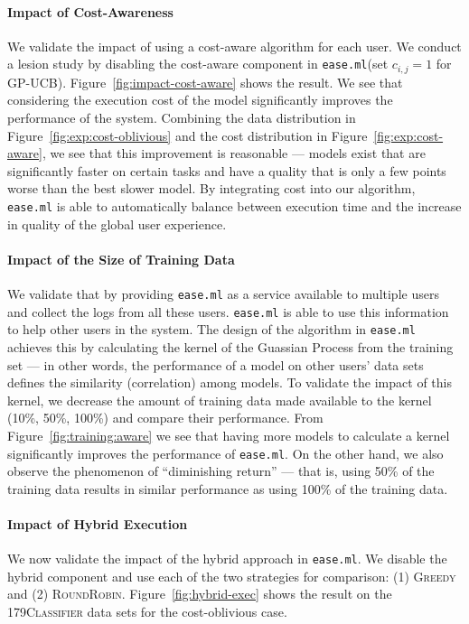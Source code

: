 \documentclass[letterpaper]{vldb}
\newcommand{\eml}{\texttt{ease.ml}\xspace}
\begin{document}
\vspace{-1em}
\paragraph*{Impact of Cost-Awareness}
We validate the impact of using 
a cost-aware algorithm
for each user. We conduct a lesion
study by disabling the cost-aware
component in \eml (set $c_{i,j}=1$
for GP-UCB). Figure~\ref{fig:impact-cost-aware}
shows the result.
We see that considering the
execution cost of the model significantly
improves the performance of the system.
Combining the data distribution in
Figure~\ref{fig:exp:cost-oblivious}
and the cost distribution in 
Figure~\ref{fig:exp:cost-aware},
we see that this improvement
is reasonable --- models exist
that are significantly faster
on certain tasks and have a quality that
is only a few points worse than the
best slower model. By integrating
cost into our algorithm, \eml is
able to automatically balance between
execution time and the increase in quality of the global
user experience.

\vspace{-1em}
\paragraph*{Impact of the Size of Training Data}

We validate that by providing \eml as
a service available to multiple users
and collect the logs from all these users.
\eml is able to use this information to
help other users in the system. The
design of the algorithm in \eml achieves
this by calculating the kernel of the Guassian Process from the training set --- in other words,
the performance of a model on other users'
data sets defines the similarity (correlation)
among models. To validate the impact
of this kernel, we decrease the amount
of training data made available to
the kernel (10\%, 50\%, 100\%) and compare their performance. 
From Figure~\ref{fig:training:aware}
we see that having more models to 
calculate a kernel significantly improves
the performance of \eml. On the other hand,
we also observe the phenomenon of ``diminishing
return'' --- that is, using 50\% of the
training data results in similar performance
as using 100\% of the training data.

\vspace{-1em}
\paragraph*{Impact of Hybrid Execution}
We now validate the impact of the hybrid 
approach in \eml.
We disable the hybrid component and use each
of the two strategies for comparison: (1)
\textsc{Greedy} and (2) \textsc{RoundRobin}.
Figure~\ref{fig:hybrid-exec} shows the result
on the \textsc{179Classifier} data sets
for the cost-oblivious case.
\end{document}
